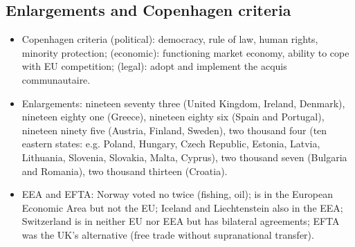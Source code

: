 \documentclass[10pt,a4paper]{article}
\begin{document}
\subsection*{Enlargements and Copenhagen criteria}
\begin{itemize}
\item Copenhagen criteria (political): democracy, rule of law, human rights, minority protection; (economic): functioning market economy, ability to cope with EU competition; (legal): adopt and implement the acquis communautaire.
\item Enlargements: nineteen seventy three (United Kingdom, Ireland, Denmark), nineteen eighty one (Greece), nineteen eighty six (Spain and Portugal), nineteen ninety five (Austria, Finland, Sweden), two thousand four (ten eastern states: e.g. Poland, Hungary, Czech Republic, Estonia, Latvia, Lithuania, Slovenia, Slovakia, Malta, Cyprus), two thousand seven (Bulgaria and Romania), two thousand thirteen (Croatia).
\item EEA and EFTA: Norway voted no twice (fishing, oil); is in the European Economic Area but not the EU; Iceland and Liechtenstein also in the EEA; Switzerland is in neither EU nor EEA but has bilateral agreements; EFTA was the UK's alternative (free trade without supranational transfer).
\end{itemize}
\end{document}
